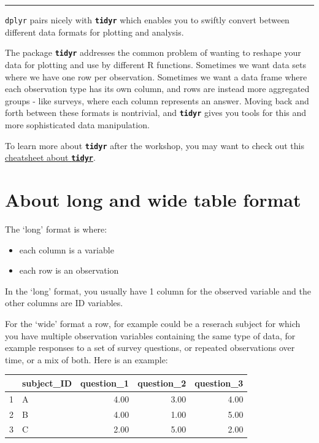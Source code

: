 \documentclass[]{book}
\providecommand{\tightlist}{%
  \setlength{\itemsep}{0pt}\setlength{\parskip}{0pt}}
\begin{document}
\begin{center}\rule{0.5\linewidth}{\linethickness}\end{center}

\texttt{dplyr} pairs nicely with \textbf{\texttt{tidyr}} which enables you to swiftly convert between different data formats for plotting and analysis.

The package \textbf{\texttt{tidyr}} addresses the common problem of wanting to reshape your data for plotting and use by different R functions. Sometimes we want data sets where we have one row per observation. Sometimes we want a data frame where each observation type has its own column, and rows are instead more aggregated groups - like surveys, where each column represents an answer. Moving back and forth between these formats is nontrivial, and \textbf{\texttt{tidyr}} gives you tools for this and more sophisticated data manipulation.

To learn more about \textbf{\texttt{tidyr}} after the workshop, you may want to check out this \href{https://github.com/rstudio/cheatsheets/raw/master/data-import.pdf}{cheatsheet about \textbf{\texttt{tidyr}}}.

\hypertarget{about-long-and-wide-table-format}{%
\section{About long and wide table format}\label{about-long-and-wide-table-format}}

The `long' format is where:

\begin{itemize}
\tightlist
\item
  each column is a variable
\item
  each row is an observation
\end{itemize}

In the `long' format, you usually have 1 column for the observed variable and
the other columns are ID variables.

For the `wide' format a row, for example could be a reserach subject for which you have multiple observation variables containing the same type of data, for example responses to a set of survey questions, or repeated observations over time, or a mix of both. Here is an example:

\begin{table}[ht]
\centering
\begin{tabular}{rlrrr}
  \hline
 & subject\_ID & question\_1 & question\_2 & question\_3 \\ 
  \hline
1 & A & 4.00 & 3.00 & 4.00 \\ 
  2 & B & 4.00 & 1.00 & 5.00 \\ 
  3 & C & 2.00 & 5.00 & 2.00 \\ 
   \hline
\end{tabular}
\end{table}
\end{document}
